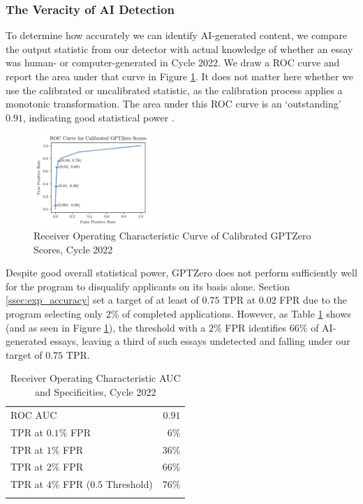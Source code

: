 \subsubsection{The Veracity of AI Detection}
To determine how accurately we can identify AI-generated content, we compare the output statistic from our detector with actual knowledge of whether an essay was human- or computer-generated in Cycle 2022. We draw a ROC curve and report the area under that curve in Figure \ref{fig:c2_roc}. It does not matter here whether we use the calibrated or uncalibrated statistic, as the calibration process applies a monotonic transformation. The area under this ROC curve is an `outstanding' $0.91$, indicating good statistical power \cite{mandrekar_receiver_2010}.

\begin{figure}[tbh]
    \centering
    \includegraphics[width=0.4\textwidth]{figures/generative_ai/ROC.png}
    \caption{Receiver Operating Characteristic Curve of Calibrated GPTZero Scores, Cycle 2022}
    \label{fig:c2_roc}
\end{figure}

Despite good overall statistical power, GPTZero does not perform sufficiently well for the program to disqualify applicants on its basis alone. Section \ref{ssec:exp_accuracy} set a target of at least of $0.75$ TPR at $0.02$ FPR due to the program selecting only $2\%$ of completed applications. However, as Table \ref{tab:c2_tprs} shows (and as seen in Figure \ref{fig:c2_roc}), the threshold with a $2\%$ FPR identifies $66\%$ of AI-generated essays, leaving a third of such essays undetected and falling under our target of $0.75$ TPR.

\begin{table}[tbh]
   \centering
   \caption{Receiver Operating Characteristic AUC and Specificities, Cycle 2022}
   \label{tab:c2_tprs}
   \begin{tabular}{ l r }
       \toprule
       ROC AUC & $0.91$ \\
       TPR at $0.1\%$ FPR & $6\%$ \\
       TPR at $1\%$ FPR & $36\%$ \\
       TPR at $2\%$ FPR & $66\%$ \\
       TPR at $4\%$ FPR ($0.5$ Threshold) & $76\%$ \\
       \bottomrule\\
   \end{tabular}
\end{table}

